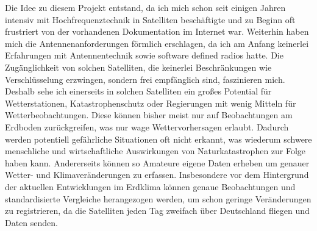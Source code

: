\begin{multicols}{2}
    Die Idee zu diesem Projekt entstand, da ich mich schon seit einigen Jahren intensiv mit Hochfrequenztechnik in Satelliten beschäftigte und zu Beginn oft frustriert von der vorhandenen Dokumentation im Internet war. Weiterhin haben mich die Antennenanforderungen förmlich erschlagen, da ich am Anfang keinerlei Erfahrungen mit Antennentechnik sowie \glqq software defined radios \grqq hatte. Die Zugänglichkeit von solchen Satelliten, die keinerlei Beschränkungen wie Verschlüsselung erzwingen, sondern frei empfänglich sind, faszinieren mich. 
    Deshalb sehe ich einerseits in solchen Satelliten ein großes Potential für Wetterstationen, Katastrophenschutz oder Regierungen mit wenig Mitteln für Wetterbeobachtungen. Diese können bisher meist nur auf Beobachtungen am Erdboden zurückgreifen, was nur wage Wettervorhersagen erlaubt. Dadurch werden potentiell gefährliche Situationen oft nicht erkannt, was wiederum schwere menschliche und wirtschaftliche Auswirkungen von Naturkatastrophen zur Folge haben kann. 
    Andererseits können so Amateure eigene Daten erheben um genauer Wetter- und Klimaveränderungen zu erfassen. 
    Insbesondere vor dem Hintergrund der aktuellen Entwicklungen im Erdklima können genaue Beobachtungen und standardisierte Vergleiche herangezogen werden, um schon geringe Veränderungen zu registrieren, da die Satelliten jeden Tag zweifach über Deutschland fliegen und Daten senden.
    \newpage

\end{multicols}
